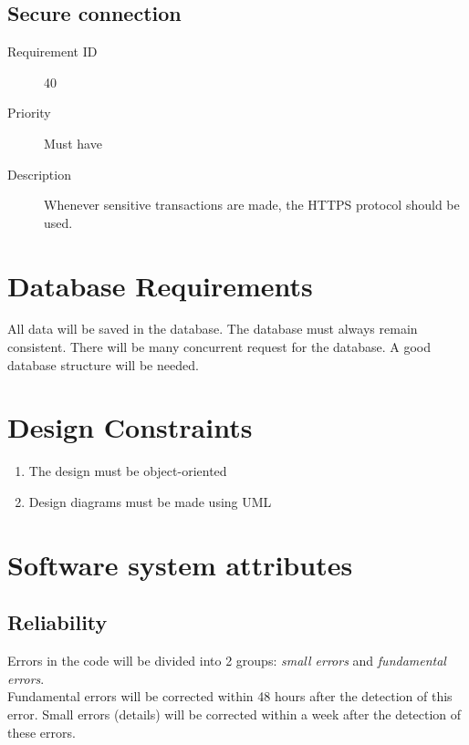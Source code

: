 	\subsection{Secure connection}
		\begin{description}
			\item[Requirement ID] 40
			\item[Priority] Must have
			\item[Description] Whenever sensitive transactions are made, the HTTPS protocol should be used.
		\end{description}
\section{Database Requirements}
	All data will be saved in the database. The database must always remain consistent. There will be many concurrent request 
	for the database. A good database structure will be needed. 
\section{Design Constraints}
	\begin{enumerate}
		\item The design must be object-oriented
		\item Design diagrams must be made using UML
	\end{enumerate}
\section{Software system attributes}
	\subsection{Reliability}
		Errors in the code will be divided into 2 groups: \textit{small errors} and \textit{fundamental errors}. \\ 
		Fundamental errors will be corrected within 48 hours after the detection of this error. Small errors (details) will be corrected within a week after the detection of these errors. 
